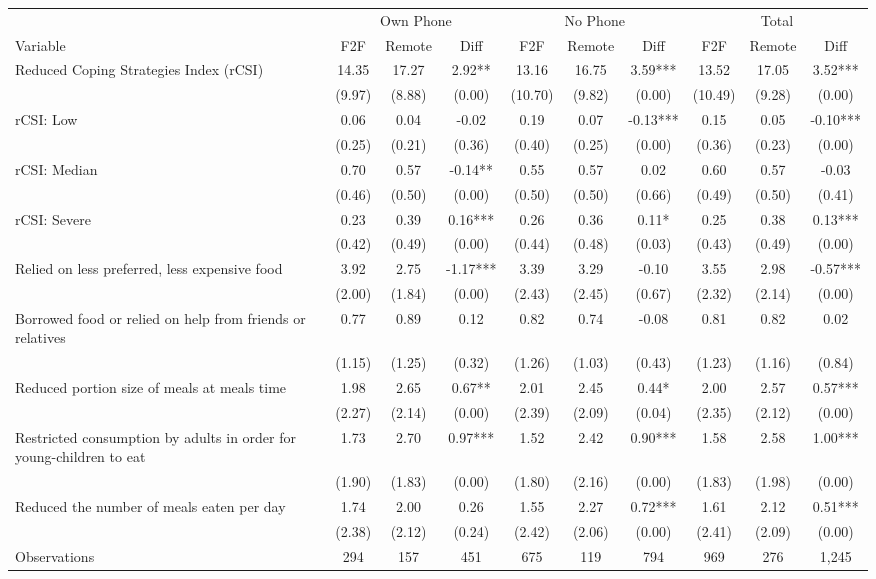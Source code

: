 \begin{tabular}{l*{9}c}
\hline\hline
 & \multicolumn{3}{c}{Own Phone} & \multicolumn{3}{c}{No Phone} & \multicolumn{3}{c}{Total}\\ 
Variable & F2F & Remote & Diff & F2F & Remote & Diff & F2F & Remote & Diff \\
\hline
Reduced Coping Strategies Index (rCSI)&14.35&17.27&2.92**&13.16&16.75&3.59***&13.52&17.05&3.52***\\
&(9.97)&(8.88)&(0.00)&(10.70)&(9.82)&(0.00)&(10.49)&(9.28)&(0.00)\\
rCSI: Low&0.06&0.04&-0.02&0.19&0.07&-0.13***&0.15&0.05&-0.10***\\
&(0.25)&(0.21)&(0.36)&(0.40)&(0.25)&(0.00)&(0.36)&(0.23)&(0.00)\\
rCSI: Median&0.70&0.57&-0.14**&0.55&0.57&0.02&0.60&0.57&-0.03\\
&(0.46)&(0.50)&(0.00)&(0.50)&(0.50)&(0.66)&(0.49)&(0.50)&(0.41)\\
rCSI: Severe&0.23&0.39&0.16***&0.26&0.36&0.11*&0.25&0.38&0.13***\\
&(0.42)&(0.49)&(0.00)&(0.44)&(0.48)&(0.03)&(0.43)&(0.49)&(0.00)\\
Relied on less preferred, less expensive food&3.92&2.75&-1.17***&3.39&3.29&-0.10&3.55&2.98&-0.57***\\
&(2.00)&(1.84)&(0.00)&(2.43)&(2.45)&(0.67)&(2.32)&(2.14)&(0.00)\\
Borrowed food or relied on help from friends or relatives&0.77&0.89&0.12&0.82&0.74&-0.08&0.81&0.82&0.02\\
&(1.15)&(1.25)&(0.32)&(1.26)&(1.03)&(0.43)&(1.23)&(1.16)&(0.84)\\
Reduced portion size of meals at meals time&1.98&2.65&0.67**&2.01&2.45&0.44*&2.00&2.57&0.57***\\
&(2.27)&(2.14)&(0.00)&(2.39)&(2.09)&(0.04)&(2.35)&(2.12)&(0.00)\\
Restricted consumption by adults in order for young-children to eat&1.73&2.70&0.97***&1.52&2.42&0.90***&1.58&2.58&1.00***\\
&(1.90)&(1.83)&(0.00)&(1.80)&(2.16)&(0.00)&(1.83)&(1.98)&(0.00)\\
Reduced the number of meals eaten per day&1.74&2.00&0.26&1.55&2.27&0.72***&1.61&2.12&0.51***\\
&(2.38)&(2.12)&(0.24)&(2.42)&(2.06)&(0.00)&(2.41)&(2.09)&(0.00)\\
\hline
Observations & 294 & 157 & 451 & 675 & 119 & 794 & 969 & 276 & 1,245 \\
\hline\hline
\end{tabular}

